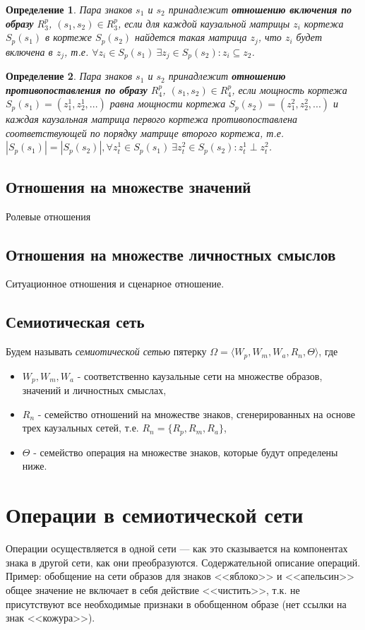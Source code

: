 \documentclass[12pt]{scrartcl}
\newtheorem{definition}{Определение}
\begin{document}
	\begin{definition}
		Пара знаков  $s_1$ и $s_2$ принадлежит \textbf{отношению включения по образу} $R_3^p$, $(s_1,s_2)\in R_3^p$, если для каждой каузальной матрицы $z_i$ кортежа $S_p(s_1)$ в кортеже $S_p(s_2)$ найдется такая матрица $z_j$, что $z_i$ будет включена в $z_j$, т.е. $\forall z_i\in S_p(s_1)\ \exists z_j\in S_p(s_2): z_i\subseteq z_2$.
	\end{definition}

	\begin{definition}
		Пара знаков  $s_1$ и $s_2$ принадлежит \textbf{отношению противопоставления по образу} $R_4^p$, $(s_1,s_2)\in R_4^p$, если мощность кортежа $S_p(s_1)=(z_1^1,z_2^1,...)$ равна мощности кортежа $S_p(s_2)=(z_1^2,z_2^2,...)$ и каждая каузальная матрица первого кортежа противопоставлена соответствующей по порядку матрице второго кортежа, т.е. $|S_p(s_1)| = |S_p(s_2)|, \forall z_t^1\in S_p(s_1)\ \exists z_t^2\in S_p(s_2): z_t^1\perp z_t^2$.
	\end{definition}
	
	
	
		
	\subsection{Отношения на множестве значений}	
	Ролевые отношения
	\subsection{Отношения на множестве личностных смыслов}	
	Ситуационное отношения и сценарное отношение.
	
	\subsection{Семиотическая сеть}
	Будем называть \textit{семиотической сетью} пятерку $\Omega=\langle W_p, W_m, W_a, R_n, \Theta \rangle$, где
	\begin{itemize}
		\item $W_p, W_m, W_a$ - соответственно каузальные сети на множестве образов, значений и личностных смыслах,
		\item $R_n$ - семейство отношений на множестве знаков, сгенерированных на основе трех каузальных сетей, т.е. $R_n=\{R_p, R_m, R_a\}$,
		\item $\Theta$ - семейство операция на множестве знаков, которые будут определены ниже.
	\end{itemize} 
	

	\section{Операции в семиотической сети}
	Операции осуществляется в одной сети --- как это сказывается на компонентах знака в другой сети, как они преобразуются. Содержательной описание операций. Пример: обобщение на сети образов для знаков <<яблоко>> и <<апельсин>> общее значение не включает в себя действие <<чистить>>, т.к. не присутствуют все необходимые признаки в обобщенном образе (нет ссылки на знак <<кожура>>).
	
\end{document}
